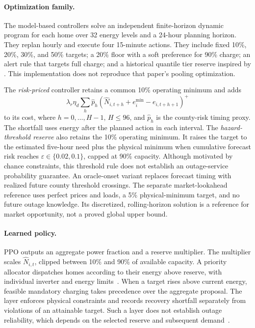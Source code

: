 \paragraph{Optimization family.}
The model-based controllers solve an independent finite-horizon dynamic program for each home over 32 energy levels and a 24-hour planning horizon. They replan hourly and execute four 15-minute actions. They include fixed 10\%, 20\%, 30\%, and 50\% targets; a 20\% floor with a soft preference for 90\% charge; an alert rule that targets full charge; and a historical quantile tier reserve inspired by \citet{anunrojwong2026pooling}. This implementation does not reproduce that paper's pooling optimization.

The \emph{risk-priced} controller retains a common 10\% operating minimum and adds
\begin{equation}
 \lambda_r\eta_d\sum_h \hat p_h\left(\hat N_{i,t+h}+e_i^{\min}-e_{i,t+h+1}\right)^+
 \label{eq:surrogate}
\end{equation}
to its cost, where $h=0,\ldots,H-1$, $H\le96$, and $\hat p_h$ is the county-risk timing proxy. The shortfall uses energy after the planned action in each interval. The \emph{hazard-threshold reserve} also retains the 10\% operating minimum. It raises the target to the estimated five-hour need plus the physical minimum when cumulative forecast risk reaches $\varepsilon\in\{0.02,0.1\}$, capped at 90\% capacity. Although motivated by chance constraints, this threshold rule does not establish an outage-service probability guarantee. An oracle-onset variant replaces forecast timing with realized future county threshold crossings. The separate market-lookahead reference uses perfect prices and loads, a 5\% physical-minimum target, and no future outage knowledge. Its discretized, rolling-horizon solution is a reference for market opportunity, not a proved global upper bound.

\paragraph{Learned policy.}
PPO outputs an aggregate power fraction and a reserve multiplier. The multiplier scales $\hat N_{i,t}$, clipped between 10\% and 90\% of available capacity. A priority allocator dispatches homes according to their energy above reserve, with individual inverter and energy limits~\citep{elsaadany2026realizability}. When a target rises above current energy, feasible mandatory charging takes precedence over the aggregate proposal. The layer enforces physical constraints and records recovery shortfall separately from violations of an attainable target. Such a layer does not establish outage reliability, which depends on the selected reserve and subsequent demand~\citep{stanojev2023safe,chen2021prof,ceusters2023safe,markgraf2025projection}.

